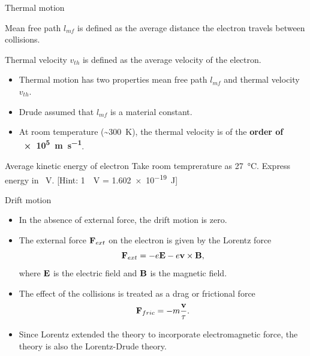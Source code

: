 %
\begin{frame}{Thermal motion}
	\begin{definition}
		Mean free path \(l_{mf}\) is defined as the average distance the electron travels between collisions.
	\end{definition}
	\begin{definition}
		Thermal velocity \(v_{th}\) is defined as the average velocity of the electron.
	\end{definition}
	\begin{itemize}
		\item Thermal motion has two properties mean free path \(l_{mf}\) and thermal velocity \(v_{th}\).
		\item Drude assumed that \(l_{mf}\) is a material constant.
		\item At room temperature (\SI{~300}{\kelvin}), the thermal velocity is of the \textbf{order of \SI{e5}{\metre\per\second}}.
	\end{itemize}
	\begin{guesstimate}{Average kinetic energy of electron}
		Take room temprerature as \SI{27}{\celsius}. Express energy in \si{\electron\volt}. \hfill [Hint: \SI{1}{\electron\volt} = \SI{1.602e-19}{\joule}]
	\end{guesstimate}
\end{frame}
%
\begin{frame}{Drift motion}
		\begin{itemize}
		\item In the absence of external force, the drift motion is zero.
		\item The external force \(\vb{F}_{ext}\) on the electron is given by the Lorentz force
		\[
		\vb{F}_{ext} = -e \vb{E} -e \vb{v}\times\vb{B},
		\]
		where \(\vb{E}\) is the electric field and \(\vb{B}\) is the magnetic field.
		\item The effect of the collisions is treated as a drag or frictional force
		\[
		\vb{F}_{fric} = -m \frac{\vb{v}}{\tau}.
		\] 
		\item Since Lorentz extended the theory to incorporate electromagnetic force, the theory is also the Lorentz-Drude theory.
	\end{itemize}
\end{frame}
%
